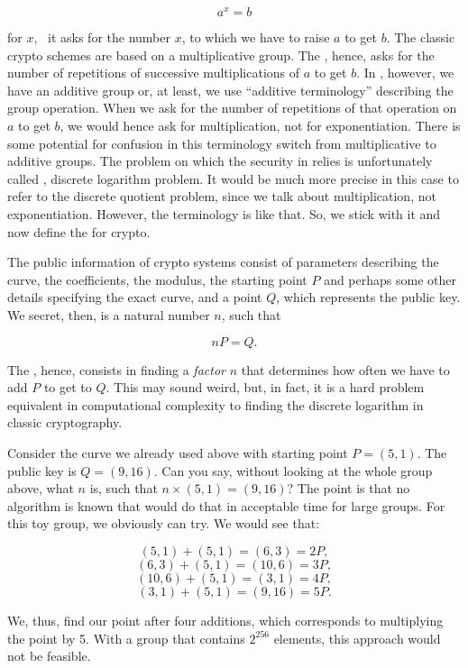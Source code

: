 \documentclass[tikz]{scrreprt}
\begin{document}
\[
a^x = b
\]

for $x$, \ie\ it asks for the number $x$,
to which we have to raise $a$ to get $b$.
The classic crypto schemes are based on
a multiplicative group. The ,
hence, asks for the number of repetitions
of successive multiplications of $a$ to get $b$.
In , however, we have an additive group or,
at least, we use ``additive terminology'' describing
the group operation. When we ask for the number
of repetitions of that operation on $a$ to get $b$,
we would hence ask for multiplication, not
for exponentiation. There is some potential 
for confusion in this terminology switch
from multiplicative to additive groups.
The problem on which the security in  relies
is unfortunately called , 
discrete logarithm problem.
It would be much more precise in this case to refer to the
discrete quotient problem, since we talk about
multiplication, not exponentiation.
However, the terminology is like that.
So, we stick with it and now define the 
for  crypto.

The public information of  crypto systems
consist of parameters describing the curve,
the coefficients, the modulus, the starting point $P$ and perhaps
some other details specifying the exact curve,
and a point $Q$, which represents the public key.
We secret, then, is a natural number $n$, such that

\begin{equation}
nP = Q.
\end{equation}

The , hence, consists in finding
a \emph{factor} $n$ that determines how often
we have to add $P$ to get to $Q$.
This may sound weird, but, in fact, it is
a hard problem equivalent in computational complexity
to finding the discrete logarithm in classic
cryptography.

Consider the curve we already used above
with starting point $P=(5,1)$. The public
key is $Q=(9,16)$. Can you say, without
looking at the whole group above, what $n$ is,
such that $n\times (5,1) = (9,16)$?
The point is that no algorithm is known
that would do that in acceptable time
for large groups.
For this toy group, we obviously can try.
We would see that:

\[
(5,1) + (5,1) = (6,3)  = 2P,
\]\[
(6,3) + (5,1) = (10,6) = 3P,
\]\[
(10,6) + (5,1) = (3,1) = 4P,
\]\[
(3,1) + (5,1) = (9,16) = 5P.
\]

We, thus, find our point after four additions,
which corresponds to multiplying the point by 5.
With a group that contains $2^{256}$ elements,
this approach would not be feasible.
\end{document}
